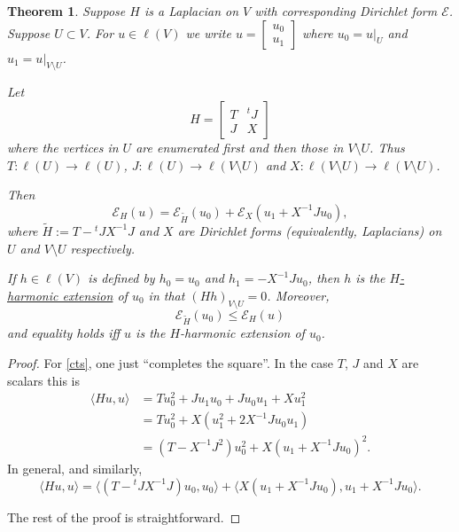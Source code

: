 \documentclass[a4paper]{amsart}
\theoremstyle{plain}
\newtheorem{theorem}{Theorem}[section]
\theoremstyle{definition}
\theoremstyle{remark}
\begin{document}
\begin{theorem} \label{inlap} Suppose $ H $ is a Laplacian on $ V $ with corresponding Dirichlet form $ \mathcal{E} $.  Suppose $ U \subset V $. For $ u \in \ell(V) $ we write   $ u = \begin{bmatrix} u_0 \\ u_1\end{bmatrix}  $ where $ u_0 = u|_U $ and $ u_1 = u|_{V \setminus U }  $.

Let
\[
H =   \begin{bmatrix}  
      T & ^t J  \\
      J & X  
   \end{bmatrix}
\]
where the vertices in $ U $ are enumerated first and then those in $ V \setminus U $.  Thus $ T : \ell(U) \to \ell(U) $, $ J : \ell(U) \to \ell(V \setminus U ) $ and $ X : \ell(V\setminus U) \to \ell(V \setminus U) $. 


Then
\begin{equation} \label{cts} 
\mathcal{E} _H(u) =  \mathcal{E} _{\widetilde{H}} (u_0) + \mathcal{E} _X( u_1 + X^{-1}J u_0 )  ,
\end{equation} 
where $ \widetilde{H} := T- \mbox{}^tJX^{-1} J $ and   $ X $    are Dirichlet forms (equivalently, Laplacians) on  $ U $ and $ V \setminus U $  respectively.

If $ h \in \ell(V) $ is defined by   $ h_0 = u_0 $ and $ h_1 = - X^{-1}Ju_0 $, then $ h $ is the \underline{$ H $-harmonic extension} of $ u_0 $ in that 
 $ (Hh)_{V\setminus U } = 0 $.   Moreover,
 \[
 \mathcal{E} _{\widetilde{H}} (u_0) \leq \mathcal{E} _H(u)  
\]
and equality holds iff $ u $ is the $ H $-harmonic extension  of $ u_0 $.
\end{theorem} 

\begin{proof} For \eqref{cts}, one just ``completes the square''.  In the   case  $ T $, $ J $ and $ X $  are scalars this is
\begin{align*} 
\langle Hu, u \rangle &= Tu_0^2 + Ju_1 u_0 + Ju_0 u_1 + Xu_1^2 \\
           &= Tu_0^2 + X(u_1^2 + 2 X^{-1} Ju_0 u_1) \\
           &= (T-X^{-1}J^2)u_0^2 + X(u_1 + X^{-1}Ju_0)^2.
\end{align*}  
In general, and similarly, 
\[
\big\langle Hu, u \big\rangle =  \big\langle(T- \mbox{}^t J X^{-1}J)u_0, u_0 \big\rangle + \big\langle X(u_1 + X^{-1}J u_0), u_1 + X^{-1} Ju_0\big\rangle  .
\]

The rest of the proof is straightforward.
\end{proof} 
\end{document}
